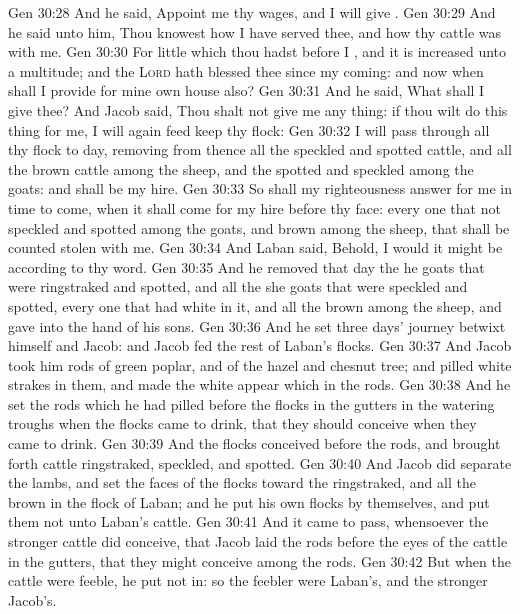 \vs Gen 30:28 And he said, Appoint me thy wages, and I will give .
\vs Gen 30:29 And he said unto him, Thou knowest how I have served thee, and how thy cattle was with me.
\vs Gen 30:30 For  little which thou hadst before I , and it is  increased unto a multitude; and the \textsc{Lord} hath blessed thee since my coming: and now when shall I provide for mine own house also?
\vs Gen 30:31 And he said, What shall I give thee? And Jacob said, Thou shalt not give me any thing: if thou wilt do this thing for me, I will again feed  keep thy flock:
\vs Gen 30:32 I will pass through all thy flock to day, removing from thence all the speckled and spotted cattle, and all the brown cattle among the sheep, and the spotted and speckled among the goats: and  shall be my hire.
\vs Gen 30:33 So shall my righteousness answer for me in time to come, when it shall come for my hire before thy face: every one that  not speckled and spotted among the goats, and brown among the sheep, that shall be counted stolen with me.
\vs Gen 30:34 And Laban said, Behold, I would it might be according to thy word.
\vs Gen 30:35 And he removed that day the he goats that were ringstraked and spotted, and all the she goats that were speckled and spotted,  every one that had  white in it, and all the brown among the sheep, and gave  into the hand of his sons.
\vs Gen 30:36 And he set three days' journey betwixt himself and Jacob: and Jacob fed the rest of Laban's flocks.
\vs Gen 30:37 And Jacob took him rods of green poplar, and of the hazel and chesnut tree; and pilled white strakes in them, and made the white appear which  in the rods.
\vs Gen 30:38 And he set the rods which he had pilled before the flocks in the gutters in the watering troughs when the flocks came to drink, that they should conceive when they came to drink.
\vs Gen 30:39 And the flocks conceived before the rods, and brought forth cattle ringstraked, speckled, and spotted.
\vs Gen 30:40 And Jacob did separate the lambs, and set the faces of the flocks toward the ringstraked, and all the brown in the flock of Laban; and he put his own flocks by themselves, and put them not unto Laban's cattle.
\vs Gen 30:41 And it came to pass, whensoever the stronger cattle did conceive, that Jacob laid the rods before the eyes of the cattle in the gutters, that they might conceive among the rods.
\vs Gen 30:42 But when the cattle were feeble, he put  not in: so the feebler were Laban's, and the stronger Jacob's.
